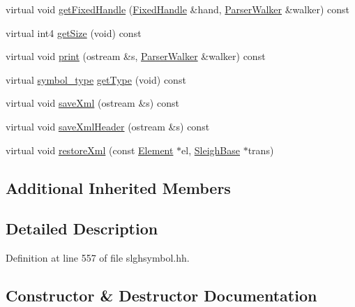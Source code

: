 \begin{DoxyCompactItemize}
\item 
virtual void \mbox{\hyperlink{class_subtable_symbol_ac06bdc86f6d571f033657702b021bf92}{get\+Fixed\+Handle}} (\mbox{\hyperlink{struct_fixed_handle}{Fixed\+Handle}} \&hand, \mbox{\hyperlink{class_parser_walker}{Parser\+Walker}} \&walker) const
\item 
virtual int4 \mbox{\hyperlink{class_subtable_symbol_a34643b05651a29f4568b69aa208b1e3a}{get\+Size}} (void) const
\item 
virtual void \mbox{\hyperlink{class_subtable_symbol_a26cbcfbd3b82eddffb9ba3c3beb0b5ac}{print}} (ostream \&s, \mbox{\hyperlink{class_parser_walker}{Parser\+Walker}} \&walker) const
\item 
virtual \mbox{\hyperlink{class_sleigh_symbol_aba70f7f332fd63488c5ec4bd7807db41}{symbol\+\_\+type}} \mbox{\hyperlink{class_subtable_symbol_a79fa8a930541c8d4f25a5ce0b5c955e9}{get\+Type}} (void) const
\item 
virtual void \mbox{\hyperlink{class_subtable_symbol_afe8d899ddb52fcdc4b26510042015b8b}{save\+Xml}} (ostream \&s) const
\item 
virtual void \mbox{\hyperlink{class_subtable_symbol_a6209b1dc388be3cc89a6834e2660cf24}{save\+Xml\+Header}} (ostream \&s) const
\item 
virtual void \mbox{\hyperlink{class_subtable_symbol_ac7ee481c0b61d730dab915a4f80e8061}{restore\+Xml}} (const \mbox{\hyperlink{class_element}{Element}} $\ast$el, \mbox{\hyperlink{class_sleigh_base}{Sleigh\+Base}} $\ast$trans)
\end{DoxyCompactItemize}
\subsection*{Additional Inherited Members}


\subsection{Detailed Description}


Definition at line 557 of file slghsymbol.\+hh.



\subsection{Constructor \& Destructor Documentation}
\mbox{\label{class_subtable_symbol_aadf83cfad03a172a63b09d2f3056d890}} 
